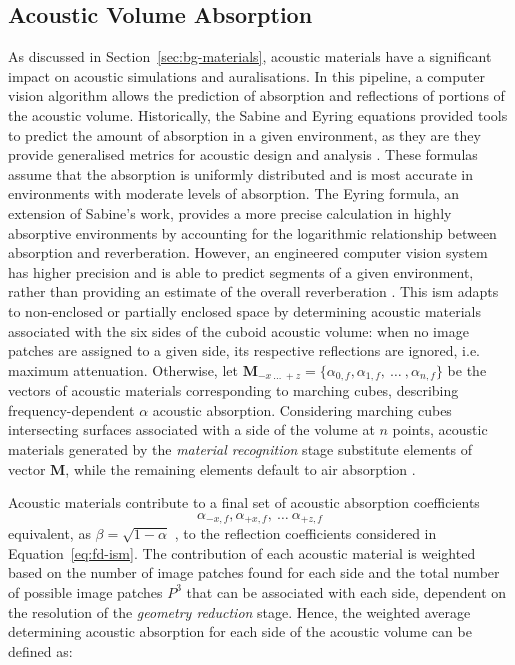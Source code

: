 \subsection{Acoustic Volume Absorption}
As discussed in Section~\ref{sec:bg-materials}, acoustic materials have a significant impact on acoustic simulations and auralisations. In this pipeline, a computer vision algorithm allows the prediction of absorption and reflections of portions of the acoustic volume. Historically, the Sabine and Eyring equations provided tools to predict the amount of absorption in a given environment, as they are they provide generalised metrics for acoustic design and analysis \citep{beranek2006analysis}. These formulas assume that the absorption is uniformly distributed and is most accurate in environments with moderate levels of absorption. The Eyring formula, an extension of Sabine's work, provides a more precise calculation in highly absorptive environments by accounting for the logarithmic relationship between absorption and reverberation. However, an engineered computer vision system has higher precision and is able to predict segments of a given environment, rather than providing an estimate of the overall reverberation \citep{schissler2017acoustic}.
This \acrshort{ism} adapts to non-enclosed or partially enclosed space by determining acoustic materials associated with the six sides of the cuboid acoustic volume: when no image patches are assigned to a given side, its respective reflections are ignored, i.e. maximum attenuation. Otherwise, let $\mathbf{M}_{-x~\dots~+z} = \{ \alpha_{0, f}, \alpha_{1, f},~\dots~, \alpha_{n, f} \}$ be the vectors of acoustic materials corresponding to marching cubes, describing frequency-dependent $\alpha$ acoustic absorption. Considering marching cubes intersecting surfaces associated with a side of the volume at $n$ points, acoustic materials generated by the \emph{material recognition} stage substitute elements of vector $\mathbf{M}$, while the remaining elements default to air absorption \citep{kates2020adding}.\par
Acoustic materials contribute to a final set of acoustic absorption coefficients 
\begin{equation}
    \alpha_{-x,f}, \alpha_{+x,f},~\dots~\alpha_{+z,f}
\end{equation}
equivalent, as $\beta = \sqrt{1 - \alpha}$ \citep{allen1979image}, to the reflection coefficients considered in Equation~\ref{eq:fd-ism}. The contribution of each acoustic material is weighted based on the number of image patches found for each side and the total number of possible image patches $P^3$ that can be associated with each side, dependent on the resolution of the \emph{geometry reduction} stage. Hence, the weighted average determining acoustic absorption for each side of the acoustic volume can be defined as: 
